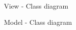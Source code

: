 \documentclass[letterpaper,12pt,oneside,listof=totoc]{scrreprt}
\begin{document}
\begin{figure}
\centering
{}
\caption{View - Class diagram}
\label{class3}
\end{figure}

\begin{figure}
\centering
{}
\caption{Model - Class diagram}
\label{class2}
\end{figure}
\end{document}
